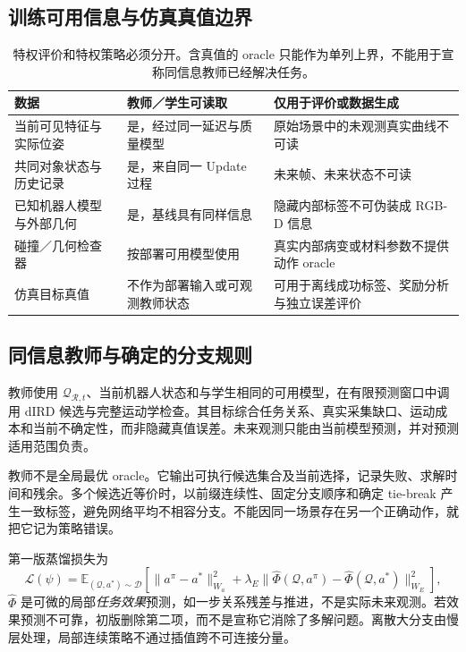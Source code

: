\documentclass[UTF8,11pt,a4paper,fontset=fandol]{ctexart}
\numberwithin{equation}{section}
\theoremstyle{definition}
\newcommand{\E}{\mathbb E}
\begin{document}
\subsection{训练可用信息与仿真真值边界}
\begin{table}[htbp]\centering\small
\begin{tabularx}{\linewidth}{P{31mm}YY}
\toprule
数据 & 教师／学生可读取 & 仅用于评价或数据生成\\\midrule
当前可见特征与实际位姿 & 是，经过同一延迟与质量模型 & 原始场景中的未观测真实曲线不可读\\
共同对象状态与历史记录 & 是，来自同一 Update 过程 & 未来帧、未来状态不可读\\
已知机器人模型与外部几何 & 是，基线具有同样信息 & 隐藏内部标签不可伪装成 RGB-D 信息\\
碰撞／几何检查器 & 按部署可用模型使用 & 真实内部病变或材料参数不提供动作 oracle\\
仿真目标真值 & 不作为部署输入或可观测教师状态 & 可用于离线成功标签、奖励分析与独立误差评价\\\bottomrule
\end{tabularx}
\caption{特权评价和特权策略必须分开。含真值的 oracle 只能作为单列上界，不能用于宣称同信息教师已经解决任务。}
\end{table}

\subsection{同信息教师与确定的分支规则}
教师使用 $\mathcal Q_{\mathcal R,t}$、当前机器人状态和与学生相同的可用模型，在有限预测窗口中调用 dIRD 候选与完整运动学检查。其目标综合任务关系、真实采集缺口、运动成本和当前不确定性，而非隐藏真值误差。未来观测只能由当前模型预测，并对预测适用范围负责。

教师不是全局最优 oracle。它输出可执行候选集合及当前选择，记录失败、求解时间和残余。多个候选近等价时，以前缀连续性、固定分支顺序和确定 tie-break 产生一致标签，避免网络平均不相容分支。不能因同一场景存在另一个正确动作，就把它记为策略错误。

第一版蒸馏损失为
\begin{equation}
\mathcal L(\psi)=\E_{(\mathcal Q,a^*)\sim\mathcal D}
\left[\|a^\pi-a^*\|_{W_a}^2
+\lambda_E\|\widehat\Phi(\mathcal Q,a^\pi)-\widehat\Phi(\mathcal Q,a^*)\|_{W_E}^2\right],
\label{eq:distill}
\end{equation}
$\widehat\Phi$ 是可微的局部\emph{任务效果}预测，如一步关系残差与推进，不是实际未来观测。若效果预测不可靠，初版删除第二项，而不是宣称它消除了多解问题。离散大分支由慢层处理，局部连续策略不通过插值跨不可连接分量。
\end{document}
